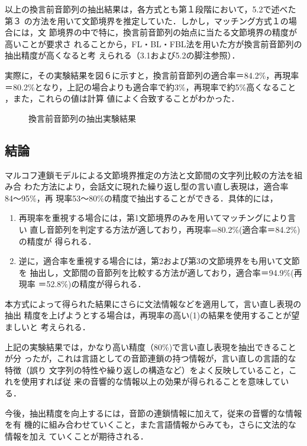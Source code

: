 以上の換言前音節列の抽出結果は，各方式とも第１段階において，5.2で述べた第３
の方法を用いて文節境界を推定していた．しかし，マッチング方式１の場合には，文
節境界の中で特に，換言前音節列の始点に当たる文節境界の精度が高いことが要求さ
れることから，FL・BL・FBL法を用いた方が換言前音節列の抽出精度が高くなると考
えられる（3.1および5.2の脚注参照）．

実際に，その実験結果を図６に示すと，換言前音節列の適合率＝84.2\%，再現率
＝80.2\%となり，上記の場合よりも適合率で約$\!$3\%，再現率で約$\!$5\%高くなること
，また，これらの値は計算\break
値によく合致することがわかった．

\begin{figure}[htbp]
  \begin{center}
    \medskip
    \caption{換言前音節列の抽出実験結果}
    \label{fig:6}
  \end{center}
\end{figure}
\vspace*{-15mm}
\subsection{結論}
マルコフ連鎖モデルによる文節境界推定の方法と文節間の文字列比較の方法を組み合
わた方法により，会話文に現れた繰り返し型の言い直し表現は，適合率84〜95\%，再
現率53〜80\%の精度で抽出することができる．具体的には，
\Vspace
\begin{enumerate}
\item 再現率を重視する場合には，第1文節境界のみを用いてマッチングにより言い
直し音節列を判定する方法が適しており，再現率=80.2\%(適合率＝84.2\%)の精度が
得られる．
\item 逆に，適合率を重視する場合には，第2および第3の文節境界をも用いて文節を
抽出し，文節間の音節列を比較する方法が適しており，適合率＝94.9\%(再現率
＝52.8\%)の精度が得られる．
\end{enumerate}

本方式によって得られた結果にさらに文法情報などを適用して，言い直し表現の抽出
精度を上げようとする場合は，再現率の高い(1)の結果を使用することが望ましいと
考えられる．

上記の実験結果では，かなり高い精度（80\%)で言い直し表現を抽出できることが分
ったが，これは言語としての音節連鎖の持つ情報が，言い直しの言語的な特徴（誤り
文字列の特性や繰り返しの構造など）をよく反映していること，これを使用すれば従
来の音響的な情報以上の効果が得られることを意味している．

今後，抽出精度を向上するには，音節の連鎖情報に加えて，従来の音響的な情報を有
機的に組み合わせていくこと，また言語情報からみても，さらに文法的な情報を加え
ていくことが期待される．

